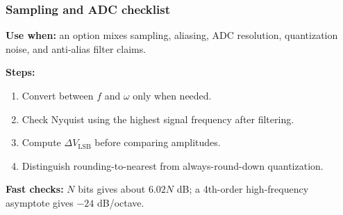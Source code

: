 \subsubsection{Sampling and ADC checklist}
\textbf{Use when:} an option mixes sampling, aliasing, ADC resolution, quantization noise, and anti-alias filter claims.

\textbf{Steps:}
\begin{enumerate}
    \item Convert between \(f\) and \(\omega\) only when needed.
    \item Check Nyquist using the highest signal frequency after filtering.
    \item Compute \(\Delta V_{\mathrm{LSB}}\) before comparing amplitudes.
    \item Distinguish rounding-to-nearest from always-round-down quantization.
\end{enumerate}

\textbf{Fast checks:} \(N\) bits gives about \(6.02N\) dB; a 4th-order high-frequency asymptote gives \(-24\) dB/octave.
